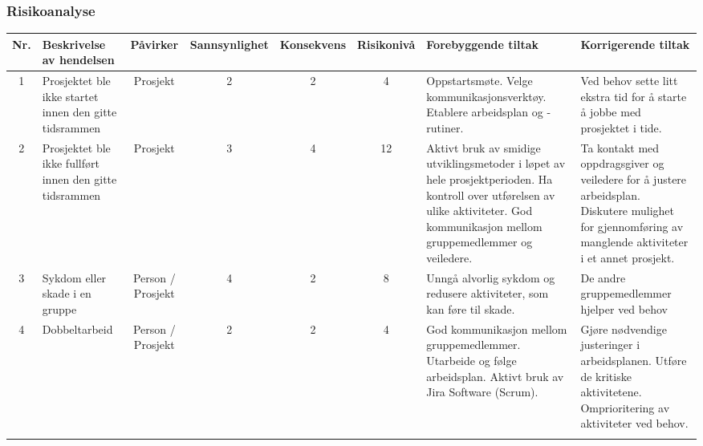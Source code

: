 \begin{landscape}
\subsubsection{Risikoanalyse}
\begin{longtable}[H]
\begin{tabular}{|c|p{4cm}|c|c|c|c|p{4cm}|p{4cm}|}    
\hline
Nr. & Beskrivelse av hendelsen & Påvirker & Sannsynlighet & Konsekvens & Risikonivå & Forebyggende tiltak & Korrigerende tiltak  \\
\hline\hline
1 & Prosjektet ble ikke startet innen den gitte tidsrammen & Prosjekt & 2 & 2 & 4 & Oppstartsmøte. Velge kommunikasjonsverktøy. Etablere arbeidsplan og -rutiner. & Ved behov sette litt ekstra tid for å starte å jobbe med prosjektet i tide.   \\
\hline
2 & Prosjektet ble ikke fullført innen den gitte tidsrammen & Prosjekt & 3 & 4 & 12 & Aktivt bruk av smidige utviklingsmetoder i løpet av hele prosjektperioden. Ha kontroll over utførelsen av ulike aktiviteter. God kommunikasjon mellom gruppemedlemmer og veiledere.  & Ta kontakt med oppdragsgiver og veiledere for å justere arbeidsplan. Diskutere mulighet for gjennomføring av manglende aktiviteter i et annet prosjekt.   \\
\hline
3 & Sykdom eller skade i en gruppe & Person / Prosjekt & 4 & 2 & 8 & Unngå alvorlig sykdom og redusere aktiviteter, som kan føre til skade. & De andre gruppemedlemmer hjelper ved behov  \\
\hline
4 & Dobbeltarbeid & Person / Prosjekt & 2 & 2 & 4 & God kommunikasjon mellom gruppemedlemmer. Utarbeide og følge arbeidsplan. Aktivt bruk av Jira Software (Scrum).    & Gjøre nødvendige justeringer i arbeidsplanen. Utføre de kritiske aktivitetene. Omprioritering av aktiviteter ved behov.  \\
\hline
\pagebreak



\end{tabular}
\end{longtable}
\end{landscape}
